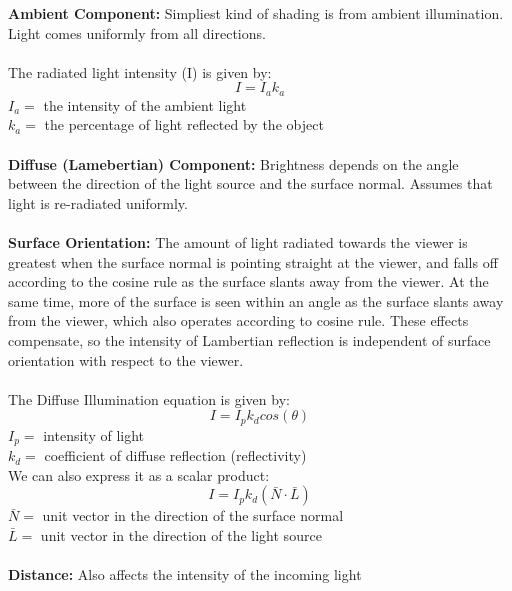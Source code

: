 \documentclass[a4paper,10pt]{article}
\begin{document}
\textcolor{Peach}{\textbf{Ambient Component:}} Simpliest kind of shading is from ambient illumination. Light comes uniformly from all directions. \\\\
\indent The radiated light intensity (I) is given by: 
\begin{equation*}
I = I_{a} k_{a}
\end{equation*}
\indent $I_{a} =$ the intensity of the ambient light \\
\indent $k_{a} =$ the percentage of light reflected by the object \\\\ 
\textcolor{Peach}{\textbf{Diffuse (Lamebertian) Component:}} Brightness depends on the angle between the direction of the light source and the surface normal. Assumes that light is re-radiated uniformly. \\\\
\newpage
\noindent \textcolor{Peach}{\textbf{Surface Orientation:}} The amount of light radiated towards the viewer is greatest when the surface normal is pointing straight at the viewer, and falls off according to the cosine rule as the surface slants away from the viewer. At the same time, more of the surface is seen within an angle as the surface slants away from the viewer, which also operates according to cosine rule. These effects compensate, so the intensity of Lambertian reflection is independent of surface orientation with respect to the viewer. \\\\
\indent The Diffuse Illumination equation is given by: 
\begin{equation*}
I = I_{p} k_{d} cos(\theta)
\end{equation*}
\indent $I_{p} = $ intensity of light \\
\indent $k_{d} = $ coefficient of diffuse reflection (reflectivity) \\
\indent We can also express it as a scalar product: 
\begin{equation*}
I = I_{p}k_{d}(\bar{N} \cdot \bar{L})
\end{equation*} 
\indent $\bar{N} =$ unit vector in the direction of the surface normal \\
\indent $\bar{L} =$ unit vector in the direction of the light source \\\\
\textcolor{Peach}{\textbf{Distance:}} Also affects the intensity of the incoming light \\\\
\end{document}
